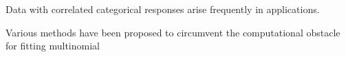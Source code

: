 \documentclass[]{report}
\theoremstyle{definition}
\begin{document}
	
\thispagestyle{empty}

Data with correlated categorical responses arise frequently in applications.

Various methods have been proposed to circumvent the computational obstacle for fitting multinomial 

    
\end{document}
